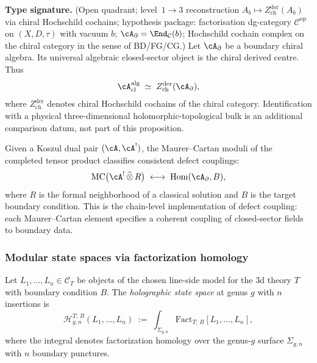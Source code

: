 \begin{proposition}
\label{prop:bulk-from-boundary}
\textbf{Type signature.} (Open quadrant; level~$1\to 3$ reconstruction
$A_b \mapsto Z^{\mathrm{der}}_{\mathrm{ch}}(A_b)$ via chiral
Hochschild cochains; hypothesis package: factorisation dg-category
$\mathcal{C}^{\mathrm{op}}$ on $(X,D,\tau)$ with vacuum $b$;
$\cA_\partial = \End_{\mathcal{C}}(b)$; Hochschild cochain complex
on the chiral category in the sense of BD/FG/CG.)
Let $\cA_\partial$ be a boundary chiral algebra. Its universal
algebraic closed-sector object is the chiral derived centre. Thus
\begin{equation}\label{eq:bulk-derived-center}
 \cA_{\mathrm{cl}}^{\mathrm{alg}}
 \;\simeq\;
 Z_{\mathrm{ch}}^{\mathrm{der}}(\cA_\partial),
\end{equation}
where $Z_{\mathrm{ch}}^{\mathrm{der}}$ denotes chiral Hochschild
cochains of the chiral category. Identification with a physical
three-dimensional holomorphic-topological bulk is an additional
comparison datum, not part of this proposition.
\end{proposition}

\begin{remark}
\label{rem:mc-defect-couplings}
Given a Koszul dual pair $(\cA, \cA^!)$, the Maurer--Cartan moduli
of the completed tensor product classifies consistent defect couplings:
\begin{equation}\label{eq:mc-defect}
 \mathrm{MC}\bigl(\cA^! \,\widehat{\otimes}\, R\bigr)
 \;\longleftrightarrow\;
 \operatorname{Hom}(\cA_\partial, B),
\end{equation}
where $R$ is the formal neighborhood of a classical solution and $B$
is the target boundary condition. This is the chain-level
implementation of defect coupling: each Maurer--Cartan element
specifies a coherent coupling of closed-sector fields to boundary data.
\end{remark}

\subsubsection{Modular state spaces via factorization homology}

\begin{definition}
\label{def:holographic-state-spaces}
Let $L_1, \dotsc, L_n \in \mathcal{C}_T$ be objects of the chosen
line-side model for the $3$d theory $T$ with boundary condition $B$.
The
\emph{holographic state space} at genus $g$ with $n$ insertions is
\begin{equation}\label{eq:holographic-state-space}
 \mathcal{H}_{g,n}^{T;\,B}(L_1, \dotsc, L_n)
 \;:=\;
 \int_{\Sigma_{g,n}}
 \mathrm{Fact}_{T;\,B}[L_1, \dotsc, L_n],
\end{equation}
where the integral denotes factorization homology over the
genus-$g$ surface $\Sigma_{g,n}$ with $n$ boundary punctures.
\end{definition}

